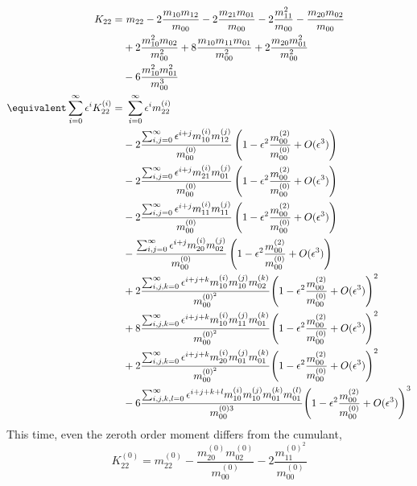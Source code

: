 \begin{align*}
  K_{22} = &\ m_{22}
   - 2 \frac{m_{10}m_{12}}{m_{00}} - 2\frac{m_{21}m_{01}}{m_{00}}
    - 2 \frac{m_{11}^2}{m_{00}} - \frac{m_{20}m_{02}}{m_{00}}
    \\
   &  + 2 \frac{m_{10}^2 m_{02}}{m_{00}^2} + 8 \frac{m_{10}m_{11}m_{01}}{m_{00}^2}
    + 2 \frac{m_{20}m_{01}^2}{m_{00}^2}
    \\
   &  - 6 \frac{m_{10}^2 m_{01}^2}{m_{00}^3}
  \\\equivalent
  \sum_{i=0}^\infty \epsilon^i K_{22}^{(i)}
  = &\ \sum_{i=0}^\infty \epsilon^i m_{22}^{(i)}
  \\&
  - 2 \frac{ \sum_{i,j=0}^\infty \epsilon^{i+j} m_{10}^{(i)} m_{12}^{(j)} }{m_{00}^{(0)}}
   \left(1 - \epsilon^2 \frac{m_{00}^{(2)}}{m_{00}^{(0)}}  + O(\epsilon^3)\right)
  \\&
  - 2 \frac{ \sum_{i,j=0}^\infty \epsilon^{i+j} m_{21}^{(i)} m_{01}^{(j)} }{m_{00}^{(0)}}
   \left(1 - \epsilon^2 \frac{m_{00}^{(2)}}{m_{00}^{(0)}}  + O(\epsilon^3)\right)
  \\&
  - 2 \frac{ \sum_{i,j=0}^\infty \epsilon^{i+j} m_{11}^{(i)} m_{11}^{(j)} }{m_{00}^{(0)}}
   \left(1 - \epsilon^2 \frac{m_{00}^{(2)}}{m_{00}^{(0)}}  + O(\epsilon^3)\right)
  \\&
  -   \frac{ \sum_{i,j=0}^\infty \epsilon^{i+j} m_{20}^{(i)} m_{02}^{(j)} }{m_{00}^{(0)}}
   \left(1 - \epsilon^2 \frac{m_{00}^{(2)}}{m_{00}^{(0)}}  + O(\epsilon^3)\right)
  \\&
  + 2 \frac{ \sum_{i,j,k=0}^\infty \epsilon^{i+j+k} m_{10}^{(i)}m_{10}^{(j)}m_{02}^{(k)} }
  {m_{00}^{{(0)}^2}}
   {\left(1 - \epsilon^2 \frac{m_{00}^{(2)}}{m_{00}^{(0)}}  + O(\epsilon^3)\right)}^2
  \\&
  + 8 \frac{ \sum_{i,j,k=0}^\infty \epsilon^{i+j+k} m_{10}^{(i)}m_{11}^{(j)}m_{01}^{(k)} }
  {m_{00}^{{(0)}^2}}
   {\left(1 - \epsilon^2 \frac{m_{00}^{(2)}}{m_{00}^{(0)}}  + O(\epsilon^3)\right)}^2
  \\&
  + 2 \frac{ \sum_{i,j,k=0}^\infty \epsilon^{i+j+k} m_{20}^{(i)}m_{01}^{(j)}m_{01}^{(k)} }
  {m_{00}^{{(0)}^2}}
   {\left(1 - \epsilon^2 \frac{m_{00}^{(2)}}{m_{00}^{(0)}}  + O(\epsilon^3)\right)}^2
  \\&
  - 6 \frac{ \sum_{i,j,k,l=0}^\infty \epsilon^{i+j+k+l} m_{10}^{(i)}m_{10}^{(j)}m_{01}^{(k)}m_{01}^{(l)}}{m_{00}^{(0)3}}
   {\left(1 - \epsilon^2 \frac{m_{00}^{(2)}}{m_{00}^{(0)}}  + O(\epsilon^3)\right)}^3
\end{align*}
This time, even the zeroth order moment differs from the cumulant,
\begin{equation}
  K_{22}^{(0)}
  = m_{22}^{(0)} - \frac{ m_{20}^{(0)} m_{02}^{(0)} }{m_{00}^{(0)}} - 2\frac{ m_{11}^{{(0)}^2}  }{m_{00}^{(0)}}
 \end{equation}
